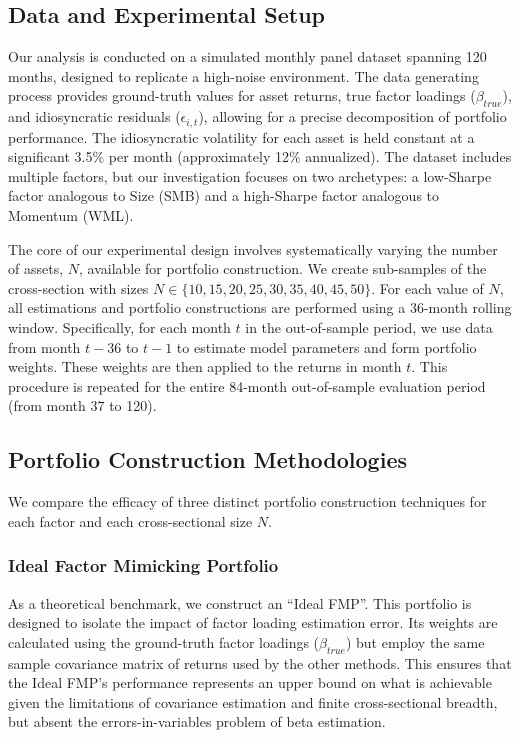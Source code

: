 \documentclass[]{article}
\begin{document}
\subsection{Data and Experimental Setup}
Our analysis is conducted on a simulated monthly panel dataset spanning 120 months, designed to replicate a high-noise environment. The data generating process provides ground-truth values for asset returns, true factor loadings ($\beta_{true}$), and idiosyncratic residuals ($\epsilon_{i,t}$), allowing for a precise decomposition of portfolio performance. The idiosyncratic volatility for each asset is held constant at a significant 3.5\% per month (approximately 12\% annualized). The dataset includes multiple factors, but our investigation focuses on two archetypes: a low-Sharpe factor analogous to Size (SMB) and a high-Sharpe factor analogous to Momentum (WML).

The core of our experimental design involves systematically varying the number of assets, $N$, available for portfolio construction. We create sub-samples of the cross-section with sizes $N \in \{10, 15, 20, 25, 30, 35, 40, 45, 50\}$. For each value of $N$, all estimations and portfolio constructions are performed using a 36-month rolling window. Specifically, for each month $t$ in the out-of-sample period, we use data from month $t-36$ to $t-1$ to estimate model parameters and form portfolio weights. These weights are then applied to the returns in month $t$. This procedure is repeated for the entire 84-month out-of-sample evaluation period (from month 37 to 120).

\subsection{Portfolio Construction Methodologies}
We compare the efficacy of three distinct portfolio construction techniques for each factor and each cross-sectional size $N$.

\subsubsection{Ideal Factor Mimicking Portfolio}
As a theoretical benchmark, we construct an ``Ideal FMP''. This portfolio is designed to isolate the impact of factor loading estimation error. Its weights are calculated using the ground-truth factor loadings ($\beta_{true}$) but employ the same sample covariance matrix of returns used by the other methods. This ensures that the Ideal FMP's performance represents an upper bound on what is achievable given the limitations of covariance estimation and finite cross-sectional breadth, but absent the errors-in-variables problem of beta estimation.
\end{document}
